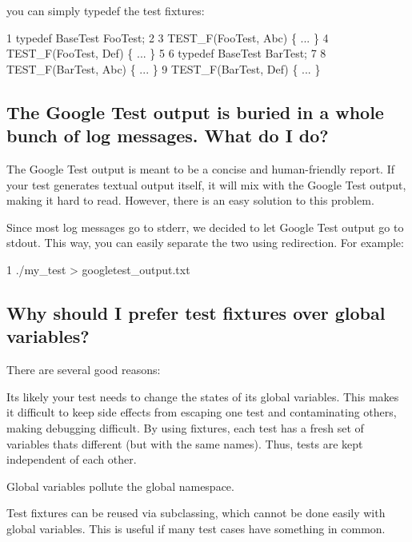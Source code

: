 you can simply {\ttfamily typedef} the test fixtures\+: 
\begin{DoxyCode}
1 typedef BaseTest FooTest;
2 
3 TEST\_F(FooTest, Abc) \{ ... \}
4 TEST\_F(FooTest, Def) \{ ... \}
5 
6 typedef BaseTest BarTest;
7 
8 TEST\_F(BarTest, Abc) \{ ... \}
9 TEST\_F(BarTest, Def) \{ ... \}
\end{DoxyCode}


\subsection*{The Google Test output is buried in a whole bunch of log messages. What do I do?}

The Google Test output is meant to be a concise and human-\/friendly report. If your test generates textual output itself, it will mix with the Google Test output, making it hard to read. However, there is an easy solution to this problem.

Since most log messages go to stderr, we decided to let Google Test output go to stdout. This way, you can easily separate the two using redirection. For example\+: 
\begin{DoxyCode}
1 ./my\_test > googletest\_output.txt
\end{DoxyCode}


\subsection*{Why should I prefer test fixtures over global variables?}

There are several good reasons\+:
\begin{DoxyEnumerate}
\item It\textquotesingle{}s likely your test needs to change the states of its global variables. This makes it difficult to keep side effects from escaping one test and contaminating others, making debugging difficult. By using fixtures, each test has a fresh set of variables that\textquotesingle{}s different (but with the same names). Thus, tests are kept independent of each other.
\end{DoxyEnumerate}
\begin{DoxyEnumerate}
\item Global variables pollute the global namespace.
\end{DoxyEnumerate}
\begin{DoxyEnumerate}
\item Test fixtures can be reused via subclassing, which cannot be done easily with global variables. This is useful if many test cases have something in common.
\end{DoxyEnumerate}

